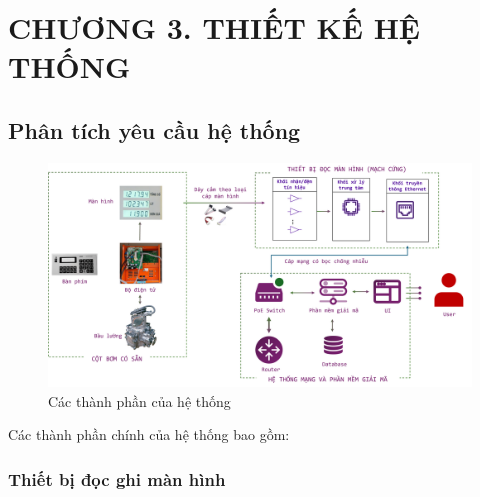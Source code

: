 \section*{CHƯƠNG 3. THIẾT KẾ HỆ THỐNG}
    
\setcounter{section}{3}
    \setcounter{subsection}{0}
        \setcounter{figure}{0}
            \setcounter{table}{0}

\subsection{Phân tích yêu cầu hệ thống}


\begin{figure}[!ht]
    \centering
    \includegraphics[width=1.0\linewidth]{Figures/Chap3_FunctionBlock-implementation.png}
    \caption{Các thành phần của hệ thống}
    \label{fig:hinh3.1}
\end{figure}

Các thành phần chính của hệ thống bao gồm:

\subsubsection{Thiết bị đọc ghi màn hình}


